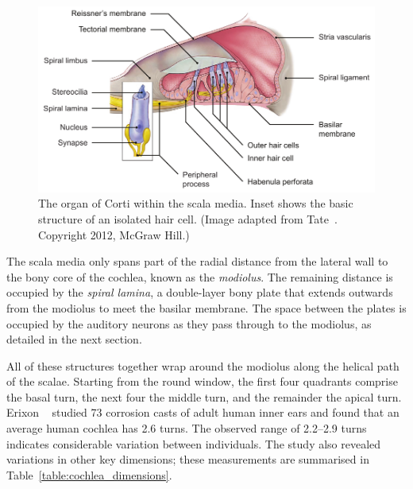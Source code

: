 \begin{figure}[p]
	\centering
	\includegraphics[width=15cm]{Background/corti_hair_cell}
	\caption[The organ of Corti]{The organ of Corti within the scala media.
	Inset shows the basic structure of an isolated hair cell. (Image adapted from
	Tate~\cite{tate2012}. Copyright \textcopyright{} 2012, McGraw Hill.)}
	\label{fig:corti}
\end{figure}

The scala media only spans part of the radial distance from the lateral wall to
the bony core of the cochlea, known as the \emph{modiolus}. The remaining
distance is occupied by the \emph{spiral lamina}, a double-layer bony plate that
extends outwards from the modiolus to meet the basilar membrane. The space
between the plates is occupied by the auditory neurons as they pass through to
the modiolus, as detailed in the next section.

All of these structures together wrap around the modiolus along the helical path
of the scalae. Starting from the round window, the first four quadrants comprise
the basal turn, the next four the middle turn, and the remainder the apical
turn. Erixon \etal~\cite{erixon2009} studied 73 corrosion casts of adult human
inner ears and found that an average human cochlea has 2.6 turns. The
observed range of 2.2--2.9 turns indicates considerable variation between
individuals. The study also revealed variations in other key dimensions; these
measurements are summarised in Table~\ref{table:cochlea_dimensions}.

